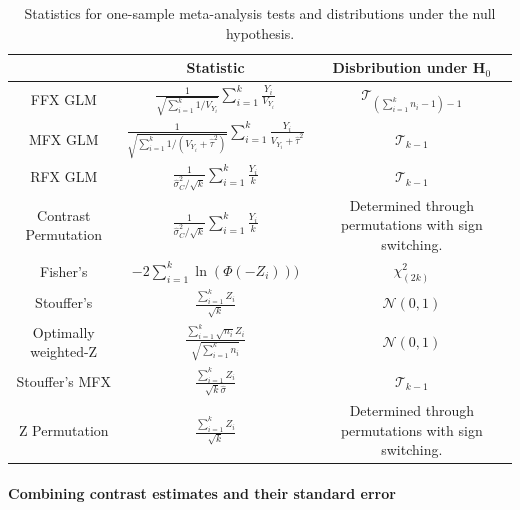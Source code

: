 \documentclass{llncs}
\newcommand{\effectvector}{Y}
\newcommand{\effect}[1][i]{\effectvector_{#1}}
\newcommand{\vareffect}[1][i]{V_{\effect[#1]}}
\newcommand{\zeffect}[1][i]{Z_{#1}}
\newcommand{\nStudies}{k}
\newcommand{\varCombined}{\sigma^2_{C}}
\newcommand{\varBetween}{\tau^2}
\begin{document}
\begin{table}[h]
\begin{center}
\begin{tabular}{ccc}
						& Statistic			& Disbribution under H$_0$ \\
\hline						
FFX GLM 		& $ \displaystyle \frac{1}{ \sqrt{\sum_{i=1}^\nStudies 1/\vareffect }} \sum_{i=1}^\nStudies \frac{\effect}{\vareffect}$ & $\mathcal{T}_{ (\sum_{i=1}^\nStudies n_i - 1) - 1}$ \\
MFX GLM 		& $ \displaystyle \frac{1}{ \sqrt{\sum_{i=1}^\nStudies 1/ (\vareffect + \hat\varBetween) }} \sum_{i=1}^\nStudies \frac{\effect}{\vareffect + \hat\varBetween}$ & $\mathcal{T}_{\nStudies - 1}$ \\
RFX GLM 		& $ \displaystyle \frac{1}{\widehat\varCombined / \sqrt{\nStudies}} \sum_{i=1}^\nStudies \frac{\effect}{\nStudies}$ & $\mathcal{T}_{\nStudies - 1}$ \\
Contrast Permutation	& $ \displaystyle \frac{1}{\widehat\varCombined / \sqrt{\nStudies}} \sum_{i=1}^\nStudies \frac{\effect}{\nStudies}$ & \parbox{5cm}{Determined through permutations with sign switching.} \\
Fisher's	& $\displaystyle -2 \sum_{i=1}^{\nStudies} \ln( \Phi(-\zeffect) ) )$ & $\chi^2_{(2\nStudies)}$\\
Stouffer's& $\displaystyle  \frac{\sum_{i=1}^\nStudies \zeffect}{\sqrt{\nStudies}}$ & $\mathcal{N}(0,1)$ \\
Optimally weighted-Z	& $\displaystyle  \frac{\sum_{i=1}^\nStudies  \sqrt{n_i} \zeffect}{\sqrt{\sum_{i=1}^\nStudies n_i}}$ & $\mathcal{N}(0,1)$ \\
Stouffer's MFX& $\displaystyle  \frac{\sum_{i=1}^\nStudies \zeffect}{\sqrt{\nStudies} \hat \sigma}$ & $\mathcal{T}_{\nStudies-1}$ \\
Z Permutation	& $\displaystyle  \frac{\sum_{i=1}^\nStudies \zeffect}{\sqrt{\nStudies}}$ & \parbox{5cm}{Determined through permutations with sign switching.} \\
\hline 

\end{tabular}
\end{center}
\caption{Statistics for one-sample meta-analysis tests and distributions under the null hypothesis.}
\label{stat_table}
\end{table}	

\paragraph{Combining contrast estimates and their standard error}
\end{document}
